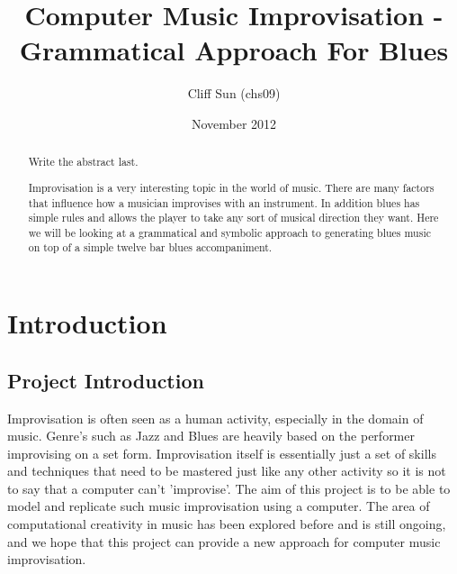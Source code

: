 \documentclass[pdftex,12pt,a4paper]{report}
\begin{document}
\title{Computer Music Improvisation - Grammatical Approach For Blues}
\author{Cliff Sun (chs09)}
\date{November 2012}
\maketitle

\begin{abstract}

Write the abstract last.



Improvisation is a very interesting topic in the world of music. There are many factors that influence how a musician improvises with an instrument. In addition blues has simple rules and allows the player to take any sort of musical direction they want. Here we will be looking at a grammatical and symbolic approach to generating blues music on top of a  simple twelve bar blues accompaniment. 

\end{abstract}

\setcounter{tocdepth}{2} %

\tableofcontents

\pagebreak

\renewcommand*\thesection{\arabic{section}}



\pagebreak

\chapter{Introduction}

\section{Project Introduction}
Improvisation is often seen as a human activity, especially in the domain of music. Genre's such as Jazz and Blues are heavily based on the performer improvising on a set form. Improvisation itself is essentially just a set of skills and techniques that need to be mastered just like any other activity so it is not to say that a computer can't 'improvise'. The aim of this project is to be able to model and replicate such music improvisation using a computer. The area of computational creativity in music has been explored before and is still ongoing, and we hope that this project can provide a new approach for computer music improvisation.
\end{document}
